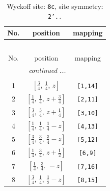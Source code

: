 \documentclass[fleqn,8pt]{jsarticle}
\begin{document}
\renewcommand{\arraystretch}{1.2}
\begin{longtable}{ccc}
\caption{Wyckoff site: {\tt 8c}, site symmetry: {\tt 2'..}}
 \\
 \hline \hline
No. & position & mapping \\ \hline \endfirsthead

\multicolumn{2}{l}{\tablename\ \thetable{}} \\
 \hline \hline
No. & position & mapping \\ \hline \endhead

 \hline \hline
\multicolumn{2}{r}{\footnotesize\it continued ...} \\ \endfoot

 \hline \hline
\multicolumn{2}{r}{} \\ \endlastfoot

1 & $\left[ \frac{3}{4},\, \frac{1}{4},\, z \right]$ & {\tt [1,14]} \\ \hline
2 & $\left[ \frac{1}{4},\, \frac{1}{4},\, z + \frac{3}{4} \right]$ & {\tt [2,11]} \\ \hline
3 & $\left[ \frac{3}{4},\, \frac{3}{4},\, z + \frac{1}{4} \right]$ & {\tt [3,10]} \\ \hline
4 & $\left[ \frac{1}{4},\, \frac{1}{4},\, \frac{1}{4} - z \right]$ & {\tt [4,13]} \\ \hline
5 & $\left[ \frac{3}{4},\, \frac{3}{4},\, \frac{3}{4} - z \right]$ & {\tt [5,12]} \\ \hline
6 & $\left[ \frac{1}{4},\, \frac{3}{4},\, z + \frac{1}{2} \right]$ & {\tt [6,9]} \\ \hline
7 & $\left[ \frac{1}{4},\, \frac{3}{4},\, - z \right]$ & {\tt [7,16]} \\ \hline
8 & $\left[ \frac{3}{4},\, \frac{1}{4},\, \frac{1}{2} - z \right]$ & {\tt [8,15]} \\
\end{longtable}
\renewcommand{\arraystretch}{1.2}
\end{document}
